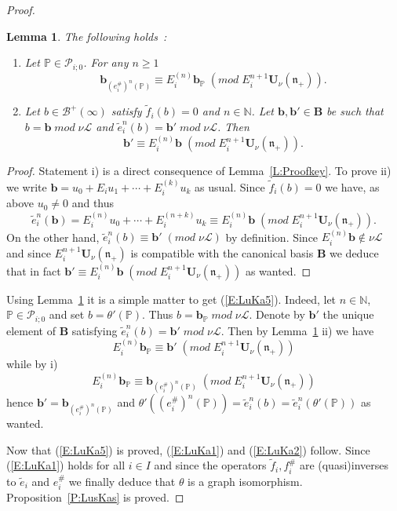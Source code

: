 \documentclass[a4paper,10pt]{amsart}
\def\U{\mathbf{U}}
\def\N{\mathbb{N}}
\def\n{\mathfrak{n}}
\newtheorem{lem}[theo]{Lemma}
\numberwithin{equation}{section}
\begin{document}
\begin{proof}
\begin{lem}\label{L:LuKa2} The following holds~:
\begin{enumerate}
\item[i)] Let $\mathbb{P} \in \mathcal{P}_{i;0}$. For any $n \geq 1$
$$\mathbf{b}_{(e_i^\#)^n(\mathbb{P})} \equiv E_i^{(n)} \mathbf{b}_{\mathbb{P}} \;(mod\; E_i^{n+1}\U_{\nu}(\n_+)).$$
\item[ii)] Let $b \in \mathcal{B}^+(\infty)$ satisfy $\tilde{f}_i(b)=0$ and $n \in \N$. Let $\mathbf{b}, \mathbf{b}' \in \mathbf{B}$ be such that
$b=\mathbf{b} \;mod\;\nu \mathcal{L}$ and $\tilde{e}_i^n(b)= \mathbf{b}' \;mod\;\nu\mathcal{L}$. Then
$$\mathbf{b}' \equiv E_i^{(n)} \mathbf{b}\;(mod\;E_i^{n+1}\U_{\nu}(\n_+)).$$
\end{enumerate}
\end{lem}
\begin{proof} Statement i) is a direct consequence of Lemma~\ref{L:Proofkey}. To prove ii) we write $\mathbf{b}=u_0 + E_iu_1 + \cdots + E_i^{(k)}u_k$ as usual. Since $\tilde{f}_i(b)=0$ we have, as above $u_0 \neq 0$ and thus 
$$\tilde{e}_i^n(\mathbf{b})=E_i^{(n)}u_0 + \cdots + E_i^{(n+k)}u_k \equiv E_i^{(n)}\mathbf{b}\;(mod\;E_i^{n+1}\U_{\nu}(\n_+)).$$
On the other hand, $\tilde{e}_i^n(b) \equiv \mathbf{b}'\;(mod\;\nu \mathcal{L})$ by definition. Since $E_i^{(n)}\mathbf{b} \not\in \nu \mathcal{L}$ and since $E_i^{n+1}\U_{\nu}(\n_+)$ is compatible with the canonical basis $\mathbf{B}$ we deduce that in fact $\mathbf{b}' \equiv E_i^{(n)}\mathbf{b}\;(mod\;E_i^{n+1}\U_{\nu}(\n_+))$ as wanted.
\end{proof}

\vspace{.1in}

Using Lemma~\ref{L:LuKa2} it is a simple matter to get (\ref{E:LuKa5}). Indeed, let $n \in \N$, $\mathbb{P} \in \mathcal{P}_{i;0}$ and set $b=\theta'(\mathbb{P})$. Thus $b =\mathbf{b}_{\mathbb{P}}\;mod\;\nu \mathcal{L}$. Denote by $\mathbf{b}'$ the unique element of $\mathbf{B}$ satisfying $\tilde{e}_i^n(b) = \mathbf{b}'\;mod\;\nu \mathcal{L}$. Then by Lemma~\ref{L:LuKa2} ii) we have
$$E_i^{(n)} \mathbf{b}_{\mathbb{P}} \equiv \mathbf{b}'\;(mod\;E_i^{n+1}\U_{\nu}(\n_+))$$
while by i)
$$E_i^{(n)}\mathbf{b}_{\mathbb{P}} \equiv \mathbf{b}_{(e_i^\#)^n(\mathbb{P})} \;(mod\; E_i^{n+1}\U_{\nu}(\n_+))$$
hence $\mathbf{b}'=\mathbf{b}_{(e_i^\#)^n(\mathbb{P})}$ and $\theta'((e_i^\#)^n(\mathbb{P}))=\tilde{e}_i^n(b)=\tilde{e}_i^n(\theta'(\mathbb{P}))$ as wanted.

\vspace{.1in}

Now that (\ref{E:LuKa5}) is proved, (\ref{E:LuKa1}) and (\ref{E:LuKa2}) follow. Since (\ref{E:LuKa1}) holds for all $i\in I$ and since the operators $\tilde{f}_i, f_i^\#$ are (quasi)inverses to $\tilde{e}_i$ and $e_i^\#$ we finally deduce that $\theta$ is a graph isomorphism. Proposition~\ref{P:LusKas} is proved.
\end{proof}
\end{document}
